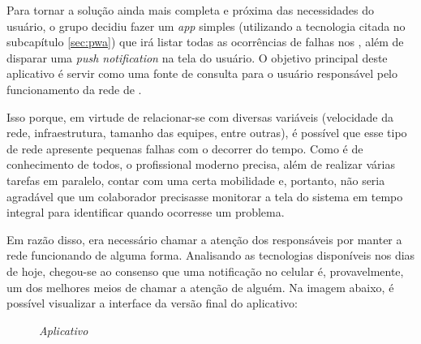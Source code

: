Para tornar a solução ainda mais completa e próxima das necessidades do usuário, o grupo decidiu fazer um \textit{app} simples (utilizando a tecnologia citada no subcapítulo \ref{sec:pwa}) que irá listar todas as ocorrências de falhas nos \containers{}, além de disparar uma \textit{push notification} na tela do usuário. O objetivo principal deste aplicativo é servir como uma fonte de consulta para o usuário responsável pelo funcionamento da rede de \containers{}.

Isso porque, em virtude de relacionar-se com diversas variáveis (velocidade da rede, infraestrutura, tamanho das equipes, entre outras), é possível que esse tipo de rede apresente pequenas falhas com o decorrer do tempo. Como é de conhecimento de todos, o profissional moderno precisa, além de realizar várias tarefas em paralelo, contar com uma certa mobilidade e, portanto, não seria agradável que um colaborador precisasse monitorar a tela do sistema em tempo integral para identificar quando ocorresse um problema.

Em razão disso, era necessário chamar a atenção dos responsáveis por manter a rede funcionando de alguma forma. Analisando as tecnologias disponíveis nos dias de hoje, chegou-se ao consenso que uma notificação no celular é, provavelmente, um dos melhores meios de chamar a atenção de alguém. Na imagem abaixo, é possível visualizar a interface da versão final do aplicativo:

\begin{figure}[!htb]
    \centering
    \caption{\textit{Aplicativo}}
    \label{fig:aplicativo}
\end{figure}